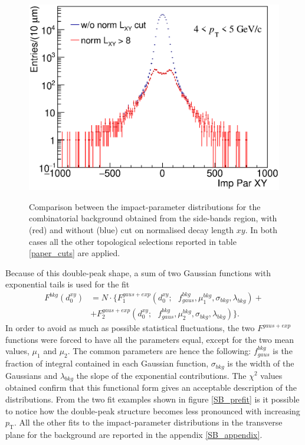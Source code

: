 \documentclass[b5paper,10pt,twoside,oldstyle,classica]{toptesi}
\newcommand{\pt}{p_\text{T}}
\begin{document}
\begin{figure}[tb]
\begin{center}
{\includegraphics[scale = 0.38]{ImpParDistr.eps}}
\caption{Comparison between the impact-parameter distributions for the combinatorial background obtained from the side-bands region, with (red) and without (blue) cut on normalised decay length $xy$. In both cases all the other topological selections reported in table \ref{paper_cuts} are applied.}
\label{double-peak}
\end{center}
\end{figure}
Because of this double-peak shape, a sum of two Gaussian functions with exponential tails is used for the fit
\begin{equation}
\begin{split}
F^{bkg}(d_0^{xy}) &= N \cdot \bigg\{F^{gaus+exp}_1(d_0^{xy};\text{ }f_{gaus}^{bkg},\mu_1^{bkg},\sigma_{bkg},\lambda_{bkg})+\\
&+F^{gaus+exp}_2(d_0^{xy};\text{ }f_{gaus}^{bkg},\mu_2^{bkg},\sigma_{bkg},\lambda_{bkg})\bigg\}.
\end{split}
\label{bkg_func}
\end{equation}
In order to avoid as much as possible statistical fluctuations, the two $F^{gaus+exp}$ functions were forced to have all the parameters equal, except for the two mean values, $\mu_1$ and $\mu_2$. The common parameters are hence the following: $f_{gaus}^{bkg}$ is the fraction of integral contained in each Gaussian function, $\sigma_{bkg}$ is the width of the Gaussians and $\lambda_{bkg}$ the slope of the exponential contributions. The $\chi^2$ values obtained confirm that this functional form gives an acceptable description of the distributions. From the two fit examples shown in figure \ref{SB_prefit} is it possible to notice how the double-peak structure becomes less pronounced with increasing $\pt$. All the other fits to the impact-parameter distributions in the transverse plane for the background are reported in the appendix \ref{SB_appendix}.
\end{document}
